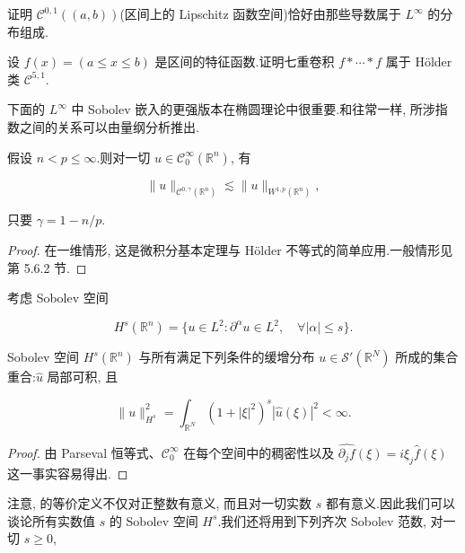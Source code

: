 
证明 $\mathcal{C}^{0, 1}((a, b))$(区间上的 Lipschitz 函数空间)恰好由那些导数属于 $L^\infty$ 的分布组成.


设 $f(x) = (a\le x\le b)$ 是区间的特征函数.证明七重卷积 $f*\cdots*f$ 属于 Hölder 类 $\mathcal{C}^{5, 1}$.

下面的 $L^\infty$ 中 Sobolev 嵌入的更强版本在椭圆理论中很重要.和往常一样, 所涉指数之间的关系可以由量纲分析推出.

\begin{theorem}\label{thm:c6-2.20}
假设 $n<p\le\infty$.则对一切 $u\in\mathcal{C}_0^\infty(\mathbb{R}^n)$, 有

\begin{equation}
\|u\|_{\mathcal{C}^{0, \gamma}(\mathbb{R}^n)} \lesssim \|u\|_{W^{1, p}(\mathbb{R}^n)}, \label{eq:c6-207}
\end{equation}

只要 $\gamma = 1 - n/p$.
\end{theorem}

\begin{proof}
在一维情形, 这是微积分基本定理与 Hölder 不等式的简单应用.一般情形见 \cite{e} 第 5.6.2 节.
\end{proof}

考虑 Sobolev 空间

\[
H^s(\mathbb{R}^n) = \{u\in L^2 : \partial^\alpha u\in L^2, \quad \forall|\alpha|\le s\}.
\]

\begin{proposition}\label{prop:c6-2.22}
Sobolev 空间 $H^s(\mathbb{R}^n)$ 与所有满足下列条件的缓增分布 $u\in\mathcal{S}'(\mathbb{R}^N)$ 所成的集合重合:$\hat{u}$ 局部可积, 且

\begin{equation}
\|u\|_{H^s}^2 = \int_{\mathbb{R}^N}(1+|\xi|^2)^s|\hat{u}(\xi)|^2 < \infty.\label{eq:c6-208}
\end{equation}
\end{proposition}

\begin{proof}
由 Parseval 恒等式、$\mathcal{C}_0^\infty$ 在每个空间中的稠密性以及 $\widehat{\partial_j f}(\xi) = i\xi_j\hat{f}(\xi)$ 这一事实容易得出.
\end{proof}

注意,  的等价定义不仅对正整数有意义, 而且对一切实数 $s$ 都有意义.因此我们可以谈论所有实数值 $s$ 的 Sobolev 空间 $H^s$.我们还将用到下列齐次 Sobolev 范数, 对一切 $s\ge 0$,

